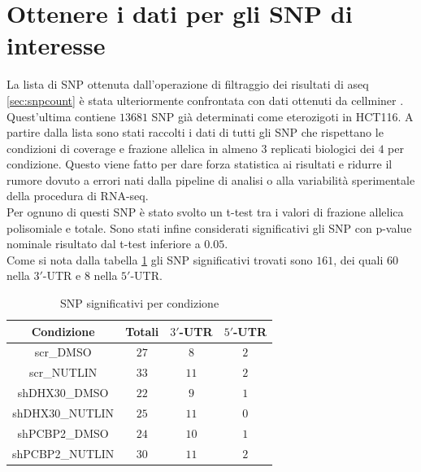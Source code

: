\section{Ottenere i dati per gli SNP di interesse}
\label{sec:snp_filter}
La lista di SNP ottenuta dall'operazione di filtraggio dei risultati di aseq \ref{sec:snpcount} \`e stata ulteriormente confrontata con dati ottenuti da cellminer \cite{cellminer}.
Quest'ultima contiene $13681$ SNP gi\`a determinati come eterozigoti in HCT116.
A partire dalla lista sono stati raccolti i dati di tutti gli SNP che rispettano le condizioni di coverage e frazione allelica in almeno $3$ replicati biologici dei $4$ per condizione.
Questo viene fatto per dare forza statistica ai risultati e ridurre il rumore dovuto a errori nati dalla pipeline di analisi o alla variabilit\`a sperimentale della procedura di RNA-seq.\\
Per ognuno di questi SNP \`e stato svolto un t-test \cite{ttest} tra i valori di frazione allelica polisomiale e totale.
Sono stati infine considerati significativi gli SNP con p-value nominale risultato dal t-test inferiore a $0.05$.\\
Come si nota dalla tabella \ref{tab:significativesnp} gli SNP significativi trovati sono $161$, dei quali $60$ nella $3'$-UTR e $8$ nella $5'$-UTR.
\begin{table}[H]
	\begin{tabular}{|c|c|c|c|}
		\hline
		Condizione & Totali & $3'$-UTR & $5'$-UTR\\
		\hline
		scr\_DMSO & $27$ & $8$ & $2$\\
		\hline
		scr\_NUTLIN & $33$ & $11$ & $2$\\
		\hline
		shDHX30\_DMSO & $22$ & $9$ & $1$\\
		\hline
		shDHX30\_NUTLIN & $25$ & $11$ & $0$\\
		\hline
		shPCBP2\_DMSO & $24$ & $10$ & $1$\\
		\hline
		shPCBP2\_NUTLIN & $30$ & $11$ & $2$\\
		\hline
	\end{tabular}
	\centering
	\caption{SNP significativi per condizione}
	\label{tab:significativesnp}
\end{table}

